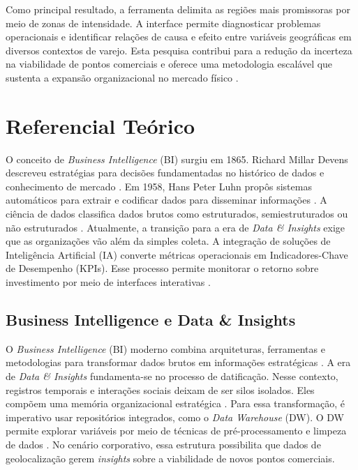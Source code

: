 Como principal resultado, a ferramenta delimita as regiões mais promissoras por meio de zonas de intensidade. A interface permite diagnosticar problemas operacionais e identificar relações de causa e efeito entre variáveis geográficas em diversos contextos de varejo. Esta pesquisa contribui para a redução da incerteza na viabilidade de pontos comerciais e oferece uma metodologia escalável que sustenta a expansão organizacional no mercado físico \cite{dahake2024}.


\section{\esp Referencial Teórico}

O conceito de \textit{Business Intelligence} (BI) surgiu em 1865. Richard Millar Devens descreveu estratégias para decisões fundamentadas no histórico de dados e conhecimento de mercado \cite{dama2009}. Em 1958, Hans Peter Luhn propôs sistemas automáticos para extrair e codificar dados para disseminar informações \cite{luhn1958}. A ciência de dados classifica dados brutos como estruturados, semiestruturados ou não estruturados \cite{sharda2019}. Atualmente, a transição para a era de \textit{Data \& Insights} exige que as organizações vão além da simples coleta. A integração de soluções de Inteligência Artificial (IA) converte métricas operacionais em Indicadores-Chave de Desempenho (KPIs). Esse processo permite monitorar o retorno sobre investimento por meio de interfaces interativas \cite{laudon2014}.

\subsection{\esp Business Intelligence e Data \& Insights} \label{subsec:bi_data}
O \textit{Business Intelligence} (BI) moderno combina arquiteturas, ferramentas e metodologias para transformar dados brutos em informações estratégicas \cite{sharda2019, barbieri2020}. A era de \textit{Data \& Insights} fundamenta-se no processo de datificação. Nesse contexto, registros temporais e interações sociais deixam de ser silos isolados. Eles compõem uma memória organizacional estratégica \cite{barbieri2020}. Para essa transformação, é imperativo usar repositórios integrados, como o \textit{Data Warehouse} (DW). O DW permite explorar variáveis por meio de técnicas de pré-processamento e limpeza de dados \cite{sharda2019, dama2009}. No cenário corporativo, essa estrutura possibilita que dados de geolocalização gerem \textit{insights} sobre a viabilidade de novos pontos comerciais.

